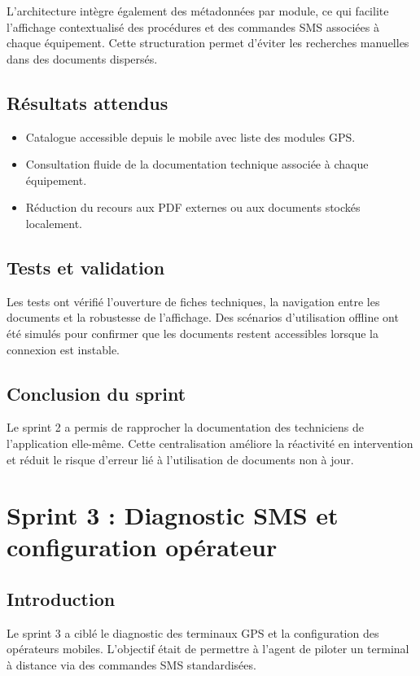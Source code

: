 \documentclass[12pt,a4paper]{report}
\begin{document}
\noindent L'architecture intègre également des métadonnées par module, ce qui facilite l'affichage contextualisé des procédures et des commandes SMS associées à chaque équipement. Cette structuration permet d'éviter les recherches manuelles dans des documents dispersés.

\section{Résultats attendus}
\begin{itemize}
    \item Catalogue accessible depuis le mobile avec liste des modules GPS.
    \item Consultation fluide de la documentation technique associée à chaque équipement.
    \item Réduction du recours aux PDF externes ou aux documents stockés localement.
\end{itemize}

\section{Tests et validation}
\noindent Les tests ont vérifié l'ouverture de fiches techniques, la navigation entre les documents et la robustesse de l'affichage. Des scénarios d'utilisation offline ont été simulés pour confirmer que les documents restent accessibles lorsque la connexion est instable.

\section{Conclusion du sprint}
\noindent Le sprint 2 a permis de rapprocher la documentation des techniciens de l'application elle-même. Cette centralisation améliore la réactivité en intervention et réduit le risque d'erreur lié à l'utilisation de documents non à jour.

\chapter{Sprint 3 : Diagnostic SMS et configuration opérateur}

\section{Introduction}
\noindent Le sprint 3 a ciblé le diagnostic des terminaux GPS et la configuration des opérateurs mobiles. L'objectif était de permettre à l'agent de piloter un terminal à distance via des commandes SMS standardisées.
\end{document}

